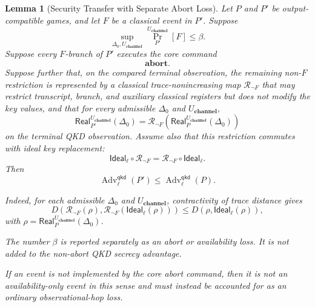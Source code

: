 \documentclass[acmsmall,screen,review,anonymous,nonacm]{acmart}
\theoremstyle{defn_style}
\newtheorem{lemma}[lem]{Lemma}
\begin{document}
\begin{lemma}[Security Transfer with Separate Abort Loss]
Let \(P\) and \(P'\) be output-compatible games, and let \(F\) be a classical
event in \(P'\). Suppose
\[
\sup_{\Delta_0,U_{\textbf{channel}}}
\Pr_{P'}^{U_{\textbf{channel}}}[F]\leq \beta .
\]
Suppose every \(F\)-branch of \(P'\) executes the core command
\[
\mathbf{abort}.
\]
Suppose further that, on the compared terminal observation, the remaining
non-\(F\) restriction is represented by a classical trace-nonincreasing map
\(\mathcal R_{\neg F}\) that may restrict transcript, branch, and auxiliary
classical registers but does not modify the key values, and that for every
admissible \(\Delta_0\) and \(U_{\textbf{channel}}\),
\[
\mathsf{Real}_{P'}^{U_{\textbf{channel}}}(\Delta_0)
=
\mathcal R_{\neg F}
\left(
\mathsf{Real}_{P}^{U_{\textbf{channel}}}(\Delta_0)
\right)
\]
on the terminal QKD observation. Assume also that this restriction commutes
with ideal key replacement:
\[
\mathsf{Ideal}_{\ell}\circ \mathcal R_{\neg F}
=
\mathcal R_{\neg F}\circ \mathsf{Ideal}_{\ell}.
\]
Then
\[
\operatorname{Adv}^{\mathsf{qkd}}_{\ell}(P')
\leq
\operatorname{Adv}^{\mathsf{qkd}}_{\ell}(P).
\]

Indeed, for each admissible \(\Delta_0\) and \(U_{\textbf{channel}}\),
contractivity of trace distance gives
\[
D\left(
\mathcal R_{\neg F}(\rho),
\mathcal R_{\neg F}(\mathsf{Ideal}_{\ell}(\rho))
\right)
\leq
D\left(
\rho,
\mathsf{Ideal}_{\ell}(\rho)
\right),
\]
with
\(\rho=\mathsf{Real}_{P}^{U_{\textbf{channel}}}(\Delta_0)\).

The number \(\beta\) is reported separately as an abort or availability loss.
It is not added to the non-abort QKD secrecy advantage.

If an event is not implemented by the core abort command, then it is not an
availability-only event in this sense and must instead be accounted for as an
ordinary observational-hop loss.
\end{lemma}
\end{document}
